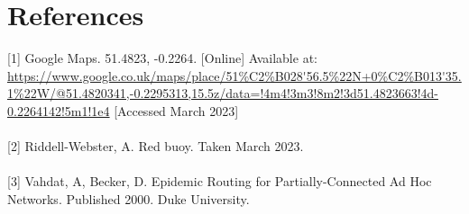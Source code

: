 \documentclass[10pt, a4paper]{article}
\begin{document}
\section*{References}
\label{maps}[1] Google Maps. 51.4823, -0.2264. [Online] Available at: \url{https://www.google.co.uk/maps/place/51%C2%B028'56.5%22N+0%C2%B013'35.1%22W/@51.4820341,-0.2295313,15.5z/data=!4m4!3m3!8m2!3d51.4823663!4d-0.2264142!5m1!1e4} [Accessed March 2023] \\ \\
\label{myphoto}[2] Riddell-Webster, A. Red buoy. Taken March 2023. \\ \\
\label{epidemic}[3] Vahdat, A, Becker, D. Epidemic Routing for Partially-Connected Ad Hoc Networks. Published 2000. Duke University.
\end{document}
